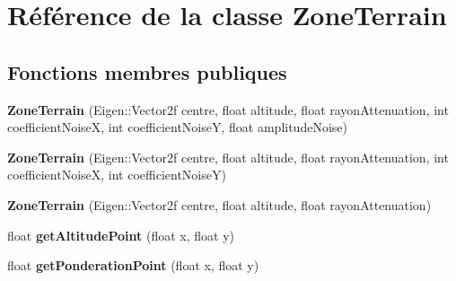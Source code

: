 \hypertarget{class_zone_terrain}{}\section{Référence de la classe Zone\+Terrain}
\label{class_zone_terrain}
\subsection*{Fonctions membres publiques}
\begin{DoxyCompactItemize}
\item 
\hypertarget{class_zone_terrain_a154d8f227ef740f7e30c6a5c1a632f9c}{}{\bfseries Zone\+Terrain} (Eigen\+::\+Vector2f centre, float altitude, float rayon\+Attenuation, int coefficient\+Noise\+X, int coefficient\+Noise\+Y, float amplitude\+Noise)\label{class_zone_terrain_a154d8f227ef740f7e30c6a5c1a632f9c}

\item 
\hypertarget{class_zone_terrain_a2e7fde68aaff841725852be40e1e9b2f}{}{\bfseries Zone\+Terrain} (Eigen\+::\+Vector2f centre, float altitude, float rayon\+Attenuation, int coefficient\+Noise\+X, int coefficient\+Noise\+Y)\label{class_zone_terrain_a2e7fde68aaff841725852be40e1e9b2f}

\item 
\hypertarget{class_zone_terrain_aa3c77b004f7877b67f0b176c2f3bde2d}{}{\bfseries Zone\+Terrain} (Eigen\+::\+Vector2f centre, float altitude, float rayon\+Attenuation)\label{class_zone_terrain_aa3c77b004f7877b67f0b176c2f3bde2d}

\item 
\hypertarget{class_zone_terrain_a208baf8e989ac0046570aa12bebb0f97}{}float {\bfseries get\+Altitude\+Point} (float x, float y)\label{class_zone_terrain_a208baf8e989ac0046570aa12bebb0f97}

\item 
\hypertarget{class_zone_terrain_aef879c189bc63fd6a3bd217b4525d891}{}float {\bfseries get\+Ponderation\+Point} (float x, float y)\label{class_zone_terrain_aef879c189bc63fd6a3bd217b4525d891}

\end{DoxyCompactItemize}
